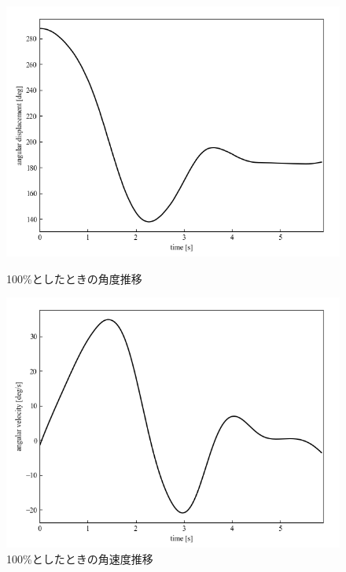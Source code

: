   \begin{figure}[h]
	\centering
	\begin{minipage}{0.43\columnwidth}
	  \centering
	  \includegraphics[width=\columnwidth]{./figure/duty100deg.png}
	  \caption{100\%としたときの角度推移}
	  \label{fig:duty100deg}
	\end{minipage}
	\hspace{5mm}
	\begin{minipage}{0.43\columnwidth}
	  \centering
	  \includegraphics[width=\columnwidth]{./figure/duty100degpers.png}
	  \caption{100\%としたときの角速度推移}
	  \label{fig:duty100degpers}
	\end{minipage}
  \end{figure}


